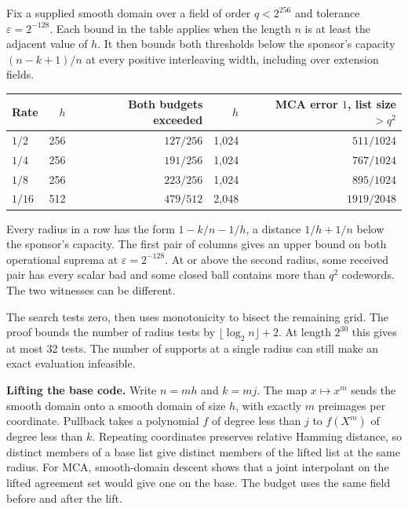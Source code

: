 \documentclass[11pt,letterpaper]{article}
\newcommand{\src}[2]{\href{https://github.com/SlopDotCash/proximityprize/blob/#1/ArkLib/Research/ProximityGap/#2.lean}{\texttt{\detokenize{#2}}}}
\begin{document}
Fix a supplied smooth domain over a field of order $q<2^{256}$ and tolerance $\varepsilon=2^{-128}$. Each bound in the table applies when the length $n$ is at least the adjacent value of $h$. It then bounds both thresholds below the sponsor's capacity $(n-k+1)/n$ at every positive interleaving width, including over extension fields.

\begin{center}
\begin{tabular}{@{}lrrrr@{}}
\toprule
Rate & $h$ & Both budgets exceeded & $h$ & MCA error $1$, list size $>q^2$ \\
\midrule
$1/2$  & 256 & $127/256$ & 1,024 & $511/1024$   \\
$1/4$  & 256 & $191/256$ & 1,024 & $767/1024$   \\
$1/8$  & 256 & $223/256$ & 1,024 & $895/1024$   \\
$1/16$ & 512 & $479/512$ & 2,048 & $1919/2048$  \\
\bottomrule
\end{tabular}
\end{center}

Every radius in a row has the form $1-k/n-1/h$, a distance $1/h+1/n$ below the sponsor's capacity. The first pair of columns gives an upper bound on both operational suprema at $\varepsilon=2^{-128}$. At or above the second radius, some received pair has every scalar bad and some closed ball contains more than $q^2$ codewords. The two witnesses can be different.

The \src{71274cb8c774ec08d796c1e17864a7d48d4c352c}{RankExecutable} search tests zero, then uses monotonicity to bisect the remaining grid. The \src{096dbdda41e7bcf12fd4d28acd8b3677282f4833}{RankBinarySearch} proof bounds the number of radius tests by $\lfloor\log_2 n\rfloor+2$. At length $2^{30}$ this gives at most 32 tests. The number of supports at a single radius can still make an exact evaluation infeasible.

\textbf{Lifting the base code.} Write $n=mh$ and $k=mj$. The map $x\mapsto x^m$ sends the smooth domain onto a smooth domain of size $h$, with exactly $m$ preimages per coordinate. Pullback takes a polynomial $f$ of degree less than $j$ to $f(X^m)$ of degree less than $k$. Repeating coordinates preserves relative Hamming distance, so distinct members of a base list give distinct members of the lifted list at the same radius. For MCA, smooth-domain descent shows that a joint interpolant on the lifted agreement set would give one on the base. The budget uses the same field before and after the lift.
\end{document}
